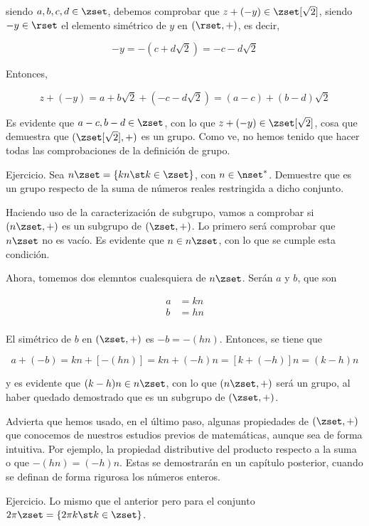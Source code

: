 \noindent siendo $a, b, c, d \in \zset$, debemos comprobar que $z + ({-y})
\in \zset[\sqrt{2}]$, siendo ${-y} \in \rset$ el elemento simétrico de $y$
en $(\rset, +)$, es decir,

$$ {-y} = {-(c + d\sqrt{2})} = {-c} - d\sqrt{2} $$

\noindent Entonces,

$$ z + ({-y}) = a + b\sqrt{2} + (-c - d\sqrt{2}) = (a - c) + (b - d)\sqrt{2}
$$

\noindent Es evidente que $a - c, b - d \in \zset$, con lo que $z + ({-y})
\in \zset[\sqrt{2}]$, cosa que demuestra que $(\zset[\sqrt{2}], +)$ es un
grupo. Como ve, no hemos tenido que hacer todas las comprobaciones de la
definición de grupo.

Ejercicio. Sea $n\zset = \{kn \st k \in \zset\}$, con $n \in \nset^*$.
Demuestre que es un grupo respecto de la suma de números reales restringida
a dicho conjunto.

Haciendo uso de la caracterización de subgrupo, vamos a comprobar si
$(n\zset, +)$ es un subgrupo de $(\zset, +)$. Lo primero será comprobar que
$n\zset$ no es vacío. Es evidente que $n \in n\zset$, con lo que se cumple
esta condición.

Ahora, tomemos dos elemntos cualesquiera de $n\zset$. Serán $a$ y $b$, que
son

\begin{align*}
  a &= kn \\
  b &= hn \\
\end{align*}

\noindent El simétrico de $b$ en $(\zset, +)$ es ${-b} = {-(hn)}$.
Entonces, se tiene que

$$ a + ({-b}) = kn + [{-(hn)}] = kn + ({-h})n = [k + ({-h})]n = (k - h)n $$

\noindent y es evidente que $(k - h)n \in n\zset$, con lo que $(n\zset, +)$
será un grupo, al haber quedado demostrado que es un subgrupo de $(\zset,
+)$.

Advierta que hemos usado, en el último paso, algunas propiedades de $(\zset,
+)$ que conocemos de nuestros estudios previos de matemáticas, aunque sea de
forma intuitiva. Por ejemplo, la propiedad distributive del producto
respecto a la suma o que ${-(hn)} = ({-h})n$. Estas se demostrarán en un
capítulo posterior, cuando se definan de forma rigurosa los números enteros.

Ejercicio. Lo mismo que el anterior pero para el conjunto $2\pi\zset =
\{2\pi k \st k \in \zset\}$.


